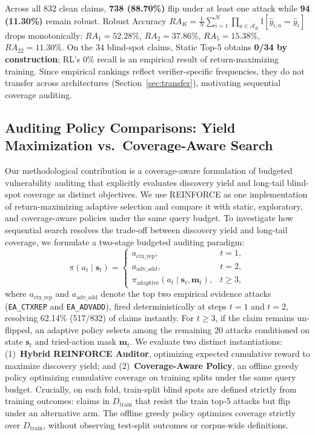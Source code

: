 \documentclass[11pt]{article}
\begin{document}
Across all 832 clean claims, \textbf{738 (88.70\%)} flip under at least one attack while \textbf{94 (11.30\%)} remain robust. Robust Accuracy $RA_K = \frac{1}{N} \sum_{i=1}^N \prod_{a \in \mathcal{A}_K} \mathbb{I}[ \hat{y}_{i,a} = \hat{y}_i ]$ drops monotonically: $RA_1 = 52.28\%$, $RA_2 = 37.86\%$, $RA_5 = 15.38\%$, $RA_{22} = 11.30\%$. On the 34 blind-spot claims, Static Top-5 obtains \textbf{0/34 by construction}; RL's 0\% recall is an empirical result of return-maximizing training. Since empirical rankings reflect verifier-specific frequencies, they do not transfer across architectures (Section~\ref{sec:transfer}), motivating sequential coverage auditing.


\subsection{Auditing Policy Comparisons: Yield Maximization vs.\ Coverage-Aware Search}
Our methodological contribution is a coverage-aware formulation of budgeted vulnerability auditing that explicitly evaluates discovery yield and long-tail blind-spot coverage as distinct objectives. We use REINFORCE as one implementation of return-maximizing adaptive selection and compare it with static, exploratory, and coverage-aware policies under the same query budget. To investigate how sequential search resolves the trade-off between discovery yield and long-tail coverage, we formulate a two-stage budgeted auditing paradigm:
\begin{equation}
\label{eq:hybrid}
\pi(a_t \mid \mathbf{s}_t) = \begin{cases} 
a_{\text{ctx\_rep}}, & t = 1, \\
a_{\text{adv\_add}}, & t = 2, \\
\pi_{\text{adaptive}}(a_t \mid \mathbf{s}_t, \mathbf{m}_t), & t \ge 3,
\end{cases}
\end{equation}
where $a_{\text{ctx\_rep}}$ and $a_{\text{adv\_add}}$ denote the top two empirical evidence attacks (\texttt{EA\_CTXREP} and \texttt{EA\_ADVADD}), fired deterministically at steps $t=1$ and $t=2$, resolving 62.14\% (517/832) of claims instantly. For $t \ge 3$, if the claim remains un-flipped, an adaptive policy selects among the remaining 20 attacks conditioned on state $\mathbf{s}_t$ and tried-action mask $\mathbf{m}_t$. We evaluate two distinct instantiations: (1)~\textbf{Hybrid REINFORCE Auditor}, optimizing expected cumulative reward to maximize discovery yield; and (2)~\textbf{Coverage-Aware Policy}, an offline greedy policy optimizing cumulative coverage on training splits under the same query budget. Crucially, on each fold, train-split blind spots are defined strictly from training outcomes: claims in $D_{\text{train}}$ that resist the train top-5 attacks but flip under an alternative arm. The offline greedy policy optimizes coverage strictly over $D_{\text{train}}$, without observing test-split outcomes or corpus-wide definitions.
\end{document}
